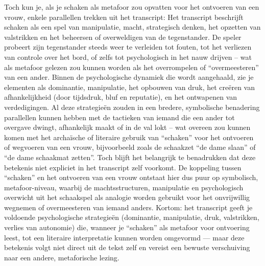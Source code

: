 Toch kun je, als je schaken als metafoor zou opvatten voor het ontvoeren van een vrouw, enkele parallellen trekken uit het transcript:
Het transcript beschrijft schaken als een spel van manipulatie, macht, strategisch denken, het opzetten van valstrikken en het beheersen of overweldigen van de tegenstander. De speler probeert zijn tegenstander steeds weer te verleiden tot fouten, tot het verliezen van controle over het bord, of zelfs tot psychologisch in het nauw drijven – wat als metafoor gelezen zou kunnen worden als het overrompelen of “overmeesteren” van een ander. Binnen de psychologische dynamiek die wordt aangehaald, zie je elementen als dominantie, manipulatie, het opbouwen van druk, het creëren van afhankelijkheid (door tijdsdruk, bluf en reputatie), en het ontwapenen van verdedigingen.
Al deze strategieën zouden in een bredere, symbolische benadering parallellen kunnen hebben met de tactieken van iemand die een ander tot overgave dwingt, afhankelijk maakt of in de val lokt – wat overeen zou kunnen komen met het archaïsche of literaire gebruik van “schaken” voor het ontvoeren of wegvoeren van een vrouw, bijvoorbeeld zoals de schaakzet “de dame slaan” of “de dame schaakmat zetten”.
Toch blijft het belangrijk te benadrukken dat deze betekenis niet expliciet in het transcript zelf voorkomt. De koppeling tussen “schaken” en het ontvoeren van een vrouw ontstaat hier dus puur op symbolisch, metafoor-niveau, waarbij de machtsstructuren, manipulatie en psychologisch overwicht uit het schaakspel als analogie worden gebruikt voor het onvrijwillig wegnemen of overmeesteren van iemand anders.
Kortom: het transcript geeft je voldoende psychologische strategieën (dominantie, manipulatie, druk, valstrikken, verlies van autonomie) die, wanneer je “schaken” als metafoor voor ontvoering leest, tot een literaire interpretatie kunnen worden omgevormd — maar deze betekenis volgt niet direct uit de tekst zelf en vereist een bewuste verschuiving naar een andere, metaforische lezing.
